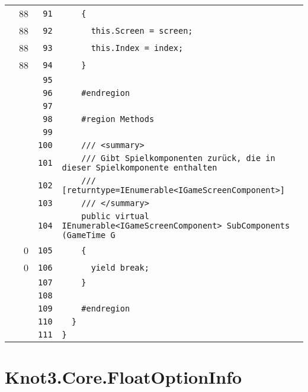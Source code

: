 \documentclass[a4paper,10pt]{article}
\begin{document}
\begin{longtable}[l]{lrrl}
\cellcolor{green} & 88 & \verb~91~ & \verb~    {~\\
\cellcolor{green} & 88 & \verb~92~ & \verb~      this.Screen = screen;~\\
\cellcolor{green} & 88 & \verb~93~ & \verb~      this.Index = index;~\\
\cellcolor{green} & 88 & \verb~94~ & \verb~    }~\\
\cellcolor{gray} &  & \verb~95~ & \verb~~\\
\cellcolor{gray} &  & \verb~96~ & \verb~    #endregion~\\
\cellcolor{gray} &  & \verb~97~ & \verb~~\\
\cellcolor{gray} &  & \verb~98~ & \verb~    #region Methods~\\
\cellcolor{gray} &  & \verb~99~ & \verb~~\\
\cellcolor{gray} &  & \verb~100~ & \verb~    /// <summary>~\\
\cellcolor{gray} &  & \verb~101~ & \verb~    /// Gibt Spielkomponenten zurück, die in dieser Spielkomponente enthalten ~\\
\cellcolor{gray} &  & \verb~102~ & \verb~    /// [returntype=IEnumerable<IGameScreenComponent>]~\\
\cellcolor{gray} &  & \verb~103~ & \verb~    /// </summary>~\\
\cellcolor{gray} &  & \verb~104~ & \verb~    public virtual IEnumerable<IGameScreenComponent> SubComponents (GameTime G~\\
\cellcolor{red} & 0 & \verb~105~ & \verb~    {~\\
\cellcolor{red} & 0 & \verb~106~ & \verb~      yield break;~\\
\cellcolor{gray} &  & \verb~107~ & \verb~    }~\\
\cellcolor{gray} &  & \verb~108~ & \verb~~\\
\cellcolor{gray} &  & \verb~109~ & \verb~    #endregion~\\
\cellcolor{gray} &  & \verb~110~ & \verb~  }~\\
\cellcolor{gray} &  & \verb~111~ & \verb~}~\\
\end{longtable}
\newpage
\section{Knot3.Core.FloatOptionInfo}
\end{document}
